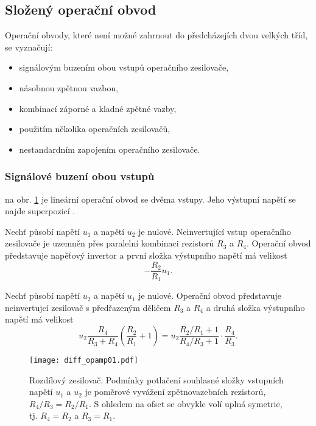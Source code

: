     \subsection{Složený operační obvod}
      Operační obvody, které není možné zahrnout do předcházejích dvou velkých tříd, se vyznačují:
        \begin{itemize}[noitemsep]
          \item signálovým buzením obou vstupů operačního zesilovače,
          \item násobnou zpětnou vazbou,
          \item kombinací záporné a kladné zpětné vazby,
          \item použitím několika operačních zesilovačů,
          \item nestandardním zapojením operačního zesilovače.
        \end{itemize}
      \subsubsection{Signálové buzení obou vstupů}
         na obr. \ref{AES:fig_diff_opamp01} je lineární operační obvod se
        dvěma vstupy. Jeho výstupní napětí se najde superpozicí \cite[s.~126]{Dostal}. 
        
        Nechť působí napětí $u_1$ a napětí $u_2$ je nulové. Neinvertující vstup operačního 
        zesilovače je uzemněn přes paralelní kombinaci rezistorů $R_3$ a $R_4$. Operační obvod 
        představuje napěťový invertor a první složka výstupního napětí má velikost 
        $$-\frac{R_2}{R_1}u_1.$$
        
        Nechť působí napětí $u_2$ a napětí $u_1$ je nulové. Operační obvod představuje neinvertujcí 
        zesilovač s předřazeným děličem $R_3$ a $R_4$ a druhá složka výstupního napětí má velikost 
        $$u_2\frac{R_4}{R_3+R_4}\left(\frac{R_2}{R_1}+1\right)= 
        u_2\frac{R_2/R_1+1}{R_4/R_3+1}\cdot\frac{R_4}{R_3}.$$
        
        \begin{figure}[ht!]
          \centering
          \texttt{[image: diff\_opamp01.pdf]}
          \caption{Rozdílový zesilovač. Podmínky potlačení souhlasné složky vstupních napětí $u_1$ a 
            $u_2$ je poměrové vyvážení zpětnovazebních rezistorů, $R_4/R_3 = R_2/R_1$. S ohledem na 
            ofset se obvykle volí uplná symetrie, tj. $R_4 = R_2$ a $R_3 = R_1$.}
          \label{AES:fig_diff_opamp01}
        \end{figure}

